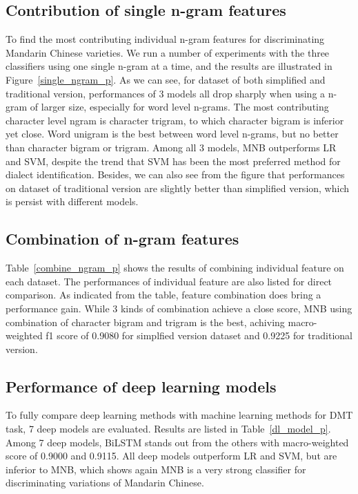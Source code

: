 \documentclass[11pt,a4paper]{article}
\begin{document}
\subsection{Contribution of single n-gram features}
To find the most contributing individual n-gram features for discriminating Mandarin Chinese varieties. We run a number of experiments with the three classifiers using one single n-gram at a time, and the results are illustrated  in Figure~\ref{single_ngram_p}. As we can see, for dataset of both simplified and traditional version, performances of 3 models all drop sharply when using a n-gram of larger size, especially for word level n-grams. The most contributing character level ngram is character trigram, to which character bigram is inferior yet close. Word unigram is the best between word level n-grams, but no better than character bigram or trigram. Among all 3 models, MNB outperforms LR and SVM, despite the trend that SVM has been the most preferred method for dialect identification. Besides, we can also see from the figure that performances on dataset of traditional version are slightly better than simplified version, which is persist with different models.

\subsection{Combination of n-gram features}
Table~\ref{combine_ngram_p} shows the results of combining individual feature on each dataset. The performances of individual feature are also listed for direct comparison. As indicated from the table, feature combination does bring a performance gain. While 3 kinds of combination achieve a close score, MNB using combination of character bigram and trigram is the best, achiving macro-weighted f1 score of 0.9080 for simplfied version dataset and 0.9225 for traditional version.

\subsection{Performance of deep learning models}
To fully compare deep learning methods with machine learning methods for DMT task, 7 deep models are evaluated. Results are listed in Table~\ref{dl_model_p}. Among 7 deep models, BiLSTM stands out from the others with macro-weighted score of 0.9000 and 0.9115. All deep models outperform LR and SVM, but are inferior to MNB, which shows again MNB is a very strong classifier for discriminating variations of Mandarin Chinese.
\end{document}
